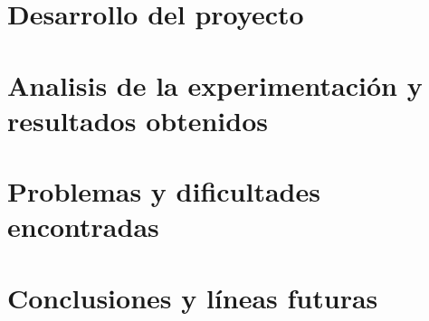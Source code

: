 \documentclass[spanish,a4paper,12pt,twoside,openright]{extreport}
\begin{document}

\newpage{\pagestyle{empty}}
\thispagestyle{empty}

\chapter{\LARGE Desarrollo del proyecto}
\label{chapter:projectDevelopment}






\newpage{\pagestyle{empty}}
\thispagestyle{empty}

\chapter{\LARGE Analisis de la experimentación y resultados obtenidos}
\label{chapter:analysisTestAndResults}



\newpage{\pagestyle{empty}}
\thispagestyle{empty}

\chapter{\LARGE Problemas y dificultades encontradas}
\label{chapter:challengesanddifficulties}




\newpage{\pagestyle{empty}}
\thispagestyle{empty}

\chapter{\LARGE Conclusiones y líneas futuras}
\label{chapter:Resultados}



\newpage{\pagestyle{empty}}
\thispagestyle{empty}
\end{document}
